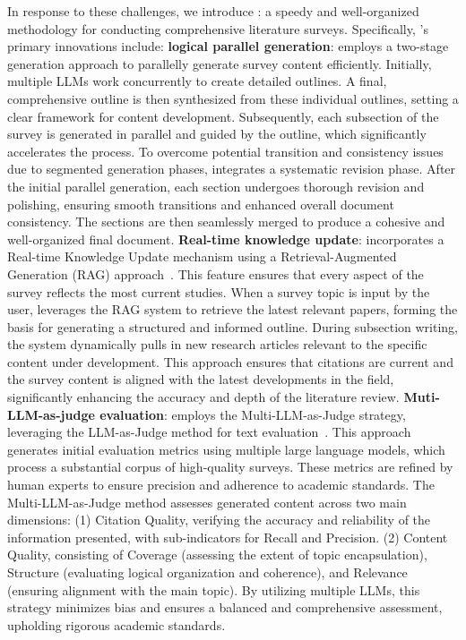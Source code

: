 In response to these challenges, we introduce \ourmethod: a speedy and well-organized methodology for conducting comprehensive literature surveys. Specifically, \ourmethod's primary innovations include: \textbf{logical parallel generation}: \ourmethod employs a two-stage generation approach to parallelly generate survey content efficiently. Initially, multiple LLMs work concurrently to create detailed outlines. A final, comprehensive outline is then synthesized from these individual outlines, setting a clear framework for content development. Subsequently, each subsection of the survey is generated in parallel and guided by the outline, which significantly accelerates the process. To overcome potential transition and consistency issues due to segmented generation phases, \ourmethod integrates a systematic revision phase. After the initial parallel generation, each section undergoes thorough revision and polishing, ensuring smooth transitions and enhanced overall document consistency. The sections are then seamlessly merged to produce a cohesive and well-organized final document. \textbf{Real-time knowledge update}: \ourmethod incorporates a Real-time Knowledge Update mechanism using a Retrieval-Augmented Generation (RAG) approach~\cite{gao2023retrieval,lewis2020retrieval,jiang2023active}. This feature ensures that every aspect of the survey reflects the most current studies. When a survey topic is input by the user, \ourmethod leverages the RAG system to retrieve the latest relevant papers, forming the basis for generating a structured and informed outline. During subsection writing, the system dynamically pulls in new research articles relevant to the specific content under development. This approach ensures that citations are current and the survey content is aligned with the latest developments in the field, significantly enhancing the accuracy and depth of the literature review. \textbf{Muti-LLM-as-judge evaluation}: \ourmethod employs the Multi-LLM-as-Judge strategy, leveraging the LLM-as-Judge method for text evaluation~\cite{zheng2024judging,pandalm2024,yu2024kieval}. This approach generates initial evaluation metrics using multiple large language models, which process a substantial corpus of high-quality surveys. These metrics are refined by human experts to ensure precision and adherence to academic standards. The Multi-LLM-as-Judge method assesses generated content across two main dimensions: (1) Citation Quality, verifying the accuracy and reliability of the information presented, with sub-indicators for Recall and Precision. (2) Content Quality, consisting of Coverage (assessing the extent of topic encapsulation), Structure (evaluating logical organization and coherence), and Relevance (ensuring alignment with the main topic). By utilizing multiple LLMs, this strategy minimizes bias and ensures a balanced and comprehensive assessment, upholding rigorous academic standards.

